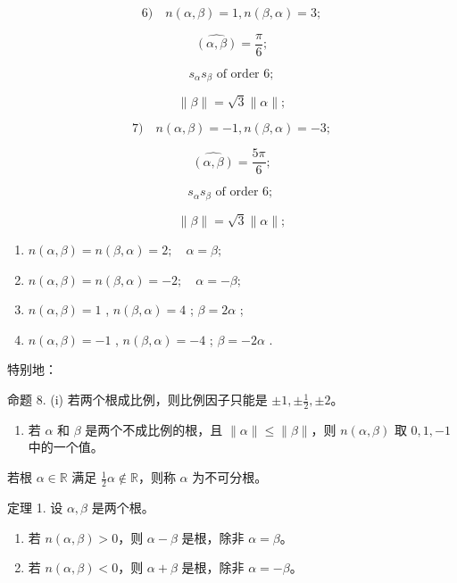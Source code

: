 \[
6) \quad n (\alpha , \beta) = 1, n (\beta , \alpha) = 3;
\]

\[
\widehat {(\alpha , \beta)} = \frac {\pi}{6};
\]

\[
s _ {\alpha} s _ {\beta} \text {   of   order   } 6;
\]

\[
\parallel \beta \parallel = \sqrt {3} \parallel \alpha \parallel ;
\]

\[
7) \quad n (\alpha , \beta) = - 1, n (\beta , \alpha) = - 3;
\]

\[
\widehat {(\alpha , \beta)} = \frac {5 \pi}{6};
\]

\[
s _ {\alpha} s _ {\beta} \text {   of   order   6;   }
\]

\[
\parallel \beta \parallel = \sqrt {3} \parallel \alpha \parallel ;
\]

\begin{enumerate}
\def\labelenumi{\arabic{enumi})}
\setcounter{enumi}{7}
\item
  \(n(\alpha, \beta) = n(\beta, \alpha) = 2; \quad \alpha = \beta;\)
\item
  \(n(\alpha, \beta) = n(\beta, \alpha) = -2; \quad \alpha = -\beta;\)
\item
  \(n(\alpha, \beta) = 1\) , \(n(\beta, \alpha) = 4\) ; \(\beta = 2\alpha\) ;
\item
  \(n(\alpha, \beta) = -1\) , \(n(\beta, \alpha) = -4\) ; \(\beta = -2\alpha\) .
\end{enumerate}

特别地：

命题 8. (i) 若两个根成比例，则比例因子只能是 \(\pm 1, \pm \frac{1}{2}, \pm 2\)。

\begin{enumerate}
\def\labelenumi{(\roman{enumi})}
\setcounter{enumi}{1}
\tightlist
\item
  若 \(\alpha\) 和 \(\beta\) 是两个不成比例的根，且 \(\| \alpha \| \leqslant \| \beta \|\)，则 \(n(\alpha, \beta)\) 取 \(0, 1, -1\) 中的一个值。
\end{enumerate}

若根 \(\alpha \in \mathbb{R}\) 满足 \(\frac{1}{2}\alpha \notin \mathbb{R}\)，则称 \(\alpha\) 为不可分根。

定理 1. 设 \(\alpha, \beta\) 是两个根。

\begin{enumerate}
\def\labelenumi{(\roman{enumi})}
\item
  若 \(n(\alpha, \beta) > 0\)，则 \(\alpha - \beta\) 是根，除非 \(\alpha = \beta\)。
\item
  若 \(n(\alpha, \beta) < 0\)，则 \(\alpha + \beta\) 是根，除非 \(\alpha = -\beta\)。
\end{enumerate}

